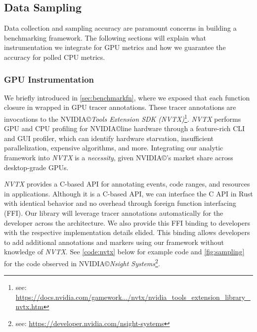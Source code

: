 \subsection{Data Sampling}
Data collection and sampling accuracy are paramount concerns in building a benchmarking framework. The following sections will explain what instrumentation we integrate for GPU metrics and how we guarantee the accuracy for polled CPU metrics.

\subsubsection{GPU Instrumentation}
We briefly introduced  in \cref{sec:benchmarkfn}, where we exposed that each function closure in wrapped in GPU tracer annotations. These tracer annotations are invocations to the NVIDIA\copyright \textit{Tools Extension SDK (NVTX)}\footnote{see: \href{https://docs.nvidia.com/gameworks/content/gameworkslibrary/nvtx/nvidia_tools_extension_library_nvtx.htm}{https://docs.nvidia.com/gamework.../nvtx/nvidia\_tools\_extension\_library\_nvtx.htm}}. \textit{NVTX} performs GPU and CPU profiling for NVIDIA\copyright line hardware through a feature-rich CLI and GUI profiler, which can identify hardware starvation, insufficient parallelization, expensive algorithms, and more. Integrating our analytic framework into \textit{NVTX} is a \emph{necessity}, given NVIDIA\copyright's market share across desktop-grade GPUs.\medskip

\textit{NVTX} provides a C-based API for annotating events, code ranges, and resources in applications. Although it is a C-based API, we can interface the C API in Rust with identical behavior and no overhead through foreign function interfacing (FFI)\cite{Crichton15}. Our library will leverage tracer annotations automatically for the developer across the architecture. We also provide this FFI binding to developers with the respective implementation details elided. This binding allows developers to add additional annotations and markers using our framework without knowledge of \textit{NVTX}. See \cref{code:nvtx} below for example code and \cref{fig:sampling} for the code observed in NVIDIA\copyright \textit{Nsight Systems}\footnote{see: \href{https://developer.nvidia.com/nsight-systems}{https://developer.nvidia.com/nsight-systems}}.

